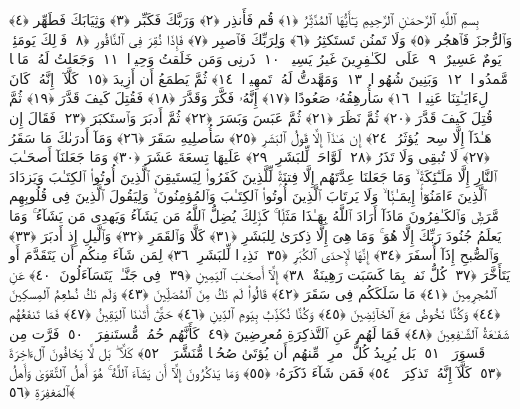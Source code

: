 
  
    
  
    
    

\nopagebreak
  بِسمِ ٱللَّهِ ٱلرَّحمَـٰنِ ٱلرَّحِيمِ
  يَـٰٓأَيُّهَا ٱلمُدَّثِّرُ ﴿١﴾
 قُم فَأَنذِر ﴿٢﴾
 وَرَبَّكَ فَكَبِّر ﴿٣﴾
 وَثِيَابَكَ فَطَهِّر ﴿٤﴾
 وَٱلرُّجزَ فَٱهجُر ﴿٥﴾
 وَلَا تَمنُن تَستَكثِرُ ﴿٦﴾
 وَلِرَبِّكَ فَٱصبِر ﴿٧﴾
 فَإِذَا نُقِرَ فِى ٱلنَّاقُورِ ﴿٨﴾
 فَذَٟلِكَ يَومَئِذٍۢ يَومٌ عَسِيرٌ ﴿٩﴾
 عَلَى ٱلكَـٰفِرِينَ غَيرُ يَسِيرٍۢ ﴿١٠﴾
 ذَرنِى وَمَن خَلَقتُ وَحِيدًۭا ﴿١١﴾
 وَجَعَلتُ لَهُۥ مَالًۭا مَّمدُودًۭا ﴿١٢﴾
 وَبَنِينَ شُهُودًۭا ﴿١٣﴾
 وَمَهَّدتُّ لَهُۥ تَمهِيدًۭا ﴿١٤﴾
 ثُمَّ يَطمَعُ أَن أَزِيدَ ﴿١٥﴾
 كَلَّآ ۖ إِنَّهُۥ كَانَ لِءَايَـٰتِنَا عَنِيدًۭا ﴿١٦﴾
 سَأُرهِقُهُۥ صَعُودًا ﴿١٧﴾
 إِنَّهُۥ فَكَّرَ وَقَدَّرَ ﴿١٨﴾
 فَقُتِلَ كَيفَ قَدَّرَ ﴿١٩﴾
 ثُمَّ قُتِلَ كَيفَ قَدَّرَ ﴿٢٠﴾
 ثُمَّ نَظَرَ ﴿٢١﴾
 ثُمَّ عَبَسَ وَبَسَرَ ﴿٢٢﴾
 ثُمَّ أَدبَرَ وَٱستَكبَرَ ﴿٢٣﴾
 فَقَالَ إِن هَـٰذَآ إِلَّا سِحرٌۭ يُؤثَرُ ﴿٢٤﴾
 إِن هَـٰذَآ إِلَّا قَولُ ٱلبَشَرِ ﴿٢٥﴾
 سَأُصلِيهِ سَقَرَ ﴿٢٦﴾
 وَمَآ أَدرَىٰكَ مَا سَقَرُ ﴿٢٧﴾
 لَا تُبقِى وَلَا تَذَرُ ﴿٢٨﴾
 لَوَّاحَةٌۭ لِّلبَشَرِ ﴿٢٩﴾
 عَلَيهَا تِسعَةَ عَشَرَ ﴿٣٠﴾
 وَمَا جَعَلنَآ أَصحَـٰبَ ٱلنَّارِ إِلَّا مَلَـٰٓئِكَةًۭ ۙ وَمَا جَعَلنَا عِدَّتَهُم إِلَّا فِتنَةًۭ لِّلَّذِينَ كَفَرُوا۟ لِيَستَيقِنَ ٱلَّذِينَ أُوتُوا۟ ٱلكِتَـٰبَ وَيَزدَادَ ٱلَّذِينَ ءَامَنُوٓا۟ إِيمَـٰنًۭا ۙ وَلَا يَرتَابَ ٱلَّذِينَ أُوتُوا۟ ٱلكِتَـٰبَ وَٱلمُؤمِنُونَ ۙ وَلِيَقُولَ ٱلَّذِينَ فِى قُلُوبِهِم مَّرَضٌۭ وَٱلكَـٰفِرُونَ مَاذَآ أَرَادَ ٱللَّهُ بِهَـٰذَا مَثَلًۭا ۚ كَذَٟلِكَ يُضِلُّ ٱللَّهُ مَن يَشَآءُ وَيَهدِى مَن يَشَآءُ ۚ وَمَا يَعلَمُ جُنُودَ رَبِّكَ إِلَّا هُوَ ۚ وَمَا هِىَ إِلَّا ذِكرَىٰ لِلبَشَرِ ﴿٣١﴾
 كَلَّا وَٱلقَمَرِ ﴿٣٢﴾
 وَٱلَّيلِ إِذ أَدبَرَ ﴿٣٣﴾
 وَٱلصُّبحِ إِذَآ أَسفَرَ ﴿٣٤﴾
 إِنَّهَا لَإِحدَى ٱلكُبَرِ ﴿٣٥﴾
 نَذِيرًۭا لِّلبَشَرِ ﴿٣٦﴾
 لِمَن شَآءَ مِنكُم أَن يَتَقَدَّمَ أَو يَتَأَخَّرَ ﴿٣٧﴾
 كُلُّ نَفسٍۭ بِمَا كَسَبَت رَهِينَةٌ ﴿٣٨﴾
 إِلَّآ أَصحَـٰبَ ٱليَمِينِ ﴿٣٩﴾
 فِى جَنَّـٰتٍۢ يَتَسَآءَلُونَ ﴿٤٠﴾
 عَنِ ٱلمُجرِمِينَ ﴿٤١﴾
 مَا سَلَكَكُم فِى سَقَرَ ﴿٤٢﴾
 قَالُوا۟ لَم نَكُ مِنَ ٱلمُصَلِّينَ ﴿٤٣﴾
 وَلَم نَكُ نُطعِمُ ٱلمِسكِينَ ﴿٤٤﴾
 وَكُنَّا نَخُوضُ مَعَ ٱلخَآئِضِينَ ﴿٤٥﴾
 وَكُنَّا نُكَذِّبُ بِيَومِ ٱلدِّينِ ﴿٤٦﴾
 حَتَّىٰٓ أَتَىٰنَا ٱليَقِينُ ﴿٤٧﴾
 فَمَا تَنفَعُهُم شَفَـٰعَةُ ٱلشَّـٰفِعِينَ ﴿٤٨﴾
 فَمَا لَهُم عَنِ ٱلتَّذكِرَةِ مُعرِضِينَ ﴿٤٩﴾
 كَأَنَّهُم حُمُرٌۭ مُّستَنفِرَةٌۭ ﴿٥٠﴾
 فَرَّت مِن قَسوَرَةٍۭ ﴿٥١﴾
 بَل يُرِيدُ كُلُّ ٱمرِئٍۢ مِّنهُم أَن يُؤتَىٰ صُحُفًۭا مُّنَشَّرَةًۭ ﴿٥٢﴾
 كَلَّا ۖ بَل لَّا يَخَافُونَ ٱلءَاخِرَةَ ﴿٥٣﴾
 كَلَّآ إِنَّهُۥ تَذكِرَةٌۭ ﴿٥٤﴾
 فَمَن شَآءَ ذَكَرَهُۥ ﴿٥٥﴾
 وَمَا يَذكُرُونَ إِلَّآ أَن يَشَآءَ ٱللَّهُ ۚ هُوَ أَهلُ ٱلتَّقوَىٰ وَأَهلُ ٱلمَغفِرَةِ ﴿٥٦﴾
 
